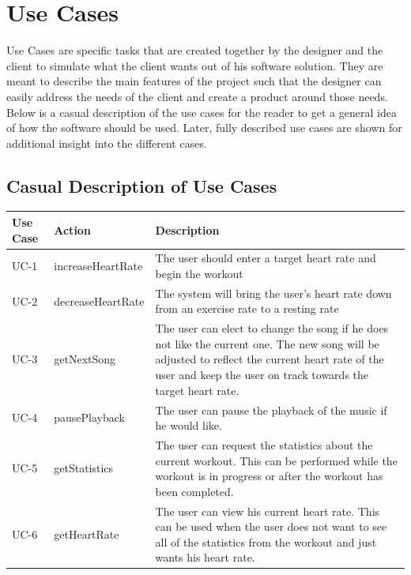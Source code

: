 \documentclass[letterpaper,english, 12pt]{scrreprt}
\begin{document}
\section{Use Cases}
Use Cases are specific tasks that are created together by the designer and the client to simulate what the client wants out of his software solution. They are meant to describe the main features of the project such that the designer can easily address the needs of the client and create a product around those needs. Below is a casual description of the use cases for the reader to get a general idea of how the software should be used. Later, fully described use cases are shown for additional insight into the different cases.

\subsection{Casual Description of Use Cases}
\begin{center}
        \begin{tabular}{|C{2cm}|C{2cm}|C{10cm}|}
                \hline
                        Use Case & Action & Description \\
                \hline
                        UC-1 & increaseHeartRate & The user should enter a target heart rate and begin the workout \\
                \hline
                        UC-2 & decreaseHeartRate & The system will bring the user's heart rate down from an exercise rate to a resting rate \\
                \hline
                        UC-3 & getNextSong & The user can elect to change the song if he does not like the current one. The new song will be adjusted to reflect the current heart rate of the user and keep the user on track towards the target heart rate. \\
                \hline
                        UC-4 & pausePlayback & The user can pause the playback of the music if he would like. \\
                \hline
                        UC-5 & getStatistics & The user can request the statistics about the current workout. This can be performed while the workout is in progress or after the workout has been completed. \\
                \hline
                        UC-6 & getHeartRate & The user can view his current heart rate. This can be used when the user does not want to see all of the statistics from the workout and just wants his heart rate. \\
                \hline
        \end{tabular}
\end{center}
\end{document}
